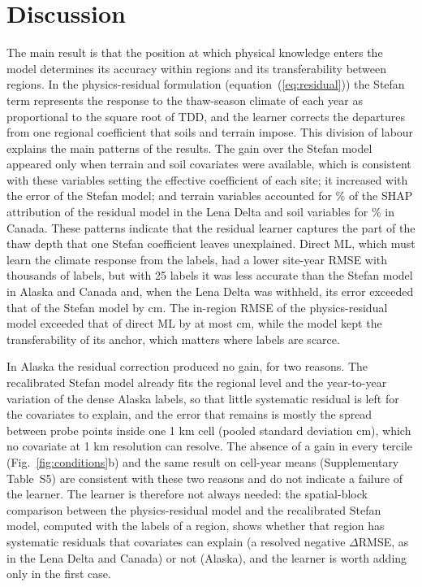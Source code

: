 \section{Discussion}\label{sec:discussion}

The main result is that the position at which physical knowledge enters the model determines its accuracy within regions and its transferability between regions. In the physics-residual formulation (equation~(\ref{eq:residual})) the Stefan term represents the response to the thaw-season climate of each year as proportional to the square root of TDD, and the learner corrects the departures from one regional coefficient that soils and terrain impose. This division of labour explains the main patterns of the results. The gain over the Stefan model appeared only when terrain and soil covariates were available, which is consistent with these variables setting the effective coefficient of each site; it increased with the error of the Stefan model; and terrain variables accounted for \nshapLeResTerrain\% of the SHAP attribution of the residual model in the Lena Delta and soil variables for \nshapCaResSoil\% in Canada. These patterns indicate that the residual learner captures the part of the thaw depth that one Stefan coefficient leaves unexplained. Direct ML, which must learn the climate response from the labels, had a lower site-year RMSE with thousands of labels, but with 25 labels it was less accurate than the Stefan model in Alaska and Canada and, when the Lena Delta was withheld, its error exceeded that of the Stefan model by \ndrefLeregDzabs{} cm. The in-region RMSE of the physics-residual model exceeded that of direct ML by at most \ndrefRoDzblkmax{} cm, while the model kept the transferability of its anchor, which matters where labels are scarce.

In Alaska the residual correction produced no gain, for two reasons. The recalibrated Stefan model already fits the regional level and the year-to-year variation of the dense Alaska labels, so that little systematic residual is left for the covariates to explain, and the error that remains is mostly the spread between probe points inside one 1 km cell (pooled standard deviation \ncyWithinSdAk{} cm), which no covariate at 1 km resolution can resolve. The absence of a gain in every tercile (Fig.~\ref{fig:conditions}b) and the same result on cell-year means (Supplementary Table~S5) are consistent with these two reasons and do not indicate a failure of the learner. The learner is therefore not always needed: the spatial-block comparison between the physics-residual model and the recalibrated Stefan model, computed with the labels of a region, shows whether that region has systematic residuals that covariates can explain (a resolved negative $\Delta$RMSE, as in the Lena Delta and Canada) or not (Alaska), and the learner is worth adding only in the first case.

